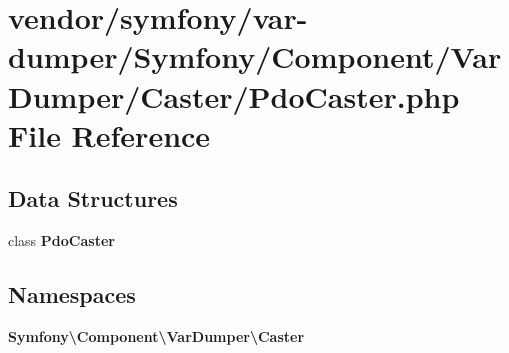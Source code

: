 \section{vendor/symfony/var-\/dumper/\+Symfony/\+Component/\+Var\+Dumper/\+Caster/\+Pdo\+Caster.php File Reference}
\label{_pdo_caster_8php}
\subsection*{Data Structures}
\begin{DoxyCompactItemize}
\item 
class {\bf Pdo\+Caster}
\end{DoxyCompactItemize}
\subsection*{Namespaces}
\begin{DoxyCompactItemize}
\item 
 {\bf Symfony\textbackslash{}\+Component\textbackslash{}\+Var\+Dumper\textbackslash{}\+Caster}
\end{DoxyCompactItemize}
